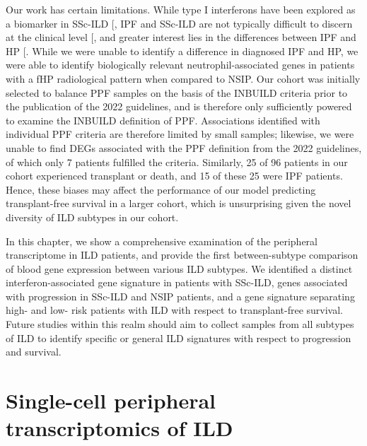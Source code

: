 \documentclass[
]{article}
\begin{document}
Our work has certain limitations. While type I interferons have been explored as a biomarker in SSc-ILD {[}\citeproc{ref-kakkar_type_2022}{146}{]}, IPF and SSc-ILD are not typically difficult to discern at the clinical level {[}\citeproc{ref-herzog_interstitial_2014}{147}{]}, and greater interest lies in the differences between IPF and HP {[}\citeproc{ref-raghu_diagnosis_2020}{150}{]}. While we were unable to identify a difference in diagnosed IPF and HP, we were able to identify biologically relevant neutrophil-associated genes in patients with a fHP radiological pattern when compared to NSIP. Our cohort was initially selected to balance PPF samples on the basis of the INBUILD criteria prior to the publication of the 2022 guidelines, and is therefore only sufficiently powered to examine the INBUILD definition of PPF. Associations identified with individual PPF criteria are therefore limited by small samples; likewise, we were unable to find DEGs associated with the PPF definition from the 2022 guidelines, of which only 7 patients fulfilled the criteria. Similarly, 25 of 96 patients in our cohort experienced transplant or death, and 15 of these 25 were IPF patients. Hence, these biases may affect the performance of our model predicting transplant-free survival in a larger cohort, which is unsurprising given the novel diversity of ILD subtypes in our cohort.

In this chapter, we show a comprehensive examination of the peripheral transcriptome in ILD patients, and provide the first between-subtype comparison of blood gene expression between various ILD subtypes. We identified a distinct interferon-associated gene signature in patients with SSc-ILD, genes associated with progression in SSc-ILD and NSIP patients, and a gene signature separating high- and low- risk patients with ILD with respect to transplant-free survival. Future studies within this realm should aim to collect samples from all subtypes of ILD to identify specific or general ILD signatures with respect to progression and survival.

\clearpage

\section{Single-cell peripheral transcriptomics of ILD}\label{single-cell-peripheral-transcriptomics-of-ild}

\renewcommand{\thefigure}{5.\arabic{figure}}
\setcounter{figure}{0}
\renewcommand{\thetable}{5.\arabic{table}}
\setcounter{table}{0}
\renewcommand{\theequation}{5.\arabic{equation}}
\setcounter{equation}{0}
\end{document}
